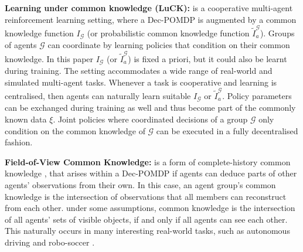 \textbf{Learning under common knowledge (LuCK):} is a  cooperative multi-agent reinforcement learning setting, where a Dec-POMDP is augmented by a common knowledge function $I_{\mathcal{G}}$ (or probabilistic common knowledge function $\tilde{I}_a^{\mathcal{G}}$). Groups of agents ${\mathcal{G}}$ can coordinate by learning policies that condition on their common knowledge. In this paper $I_{\mathcal{G}}$ (or $\tilde{I}_a^{\mathcal{G}}$) is fixed a priori, but it could also be learnt during training. The setting accommodates a wide range of real-world and simulated multi-agent tasks. Whenever a task is cooperative and learning is centralised, then agents can naturally learn suitable $I_{\mathcal{G}}$ or $\tilde{I}_a^{\mathcal{G}}$. Policy parameters can be exchanged during training as well and thus become part of the commonly known data $\xi$. Joint policies where coordinated decisions of a group ${\mathcal{G}}$ only condition on the common knowledge of ${\mathcal{G}}$ can be executed in a fully decentralised fashion.

\textbf{Field-of-View Common Knowledge:} is a form of complete-history common knowledge \parencite{knowledge_common_knowledge_distributed_env}, that arises within a Dec-POMDP if agents can deduce parts of other agents’ observations from their own. In this case, an agent group’s common knowledge is the intersection of observations that all members can reconstruct from each other. under some assumptions, common knowledge is the intersection of all agents’ sets of visible objects, if and only if all agents can see each other. This naturally occurs in many interesting real-world tasks, such as autonomous driving and robo-soccer \parencite{robot_soccer}.
\newpage


